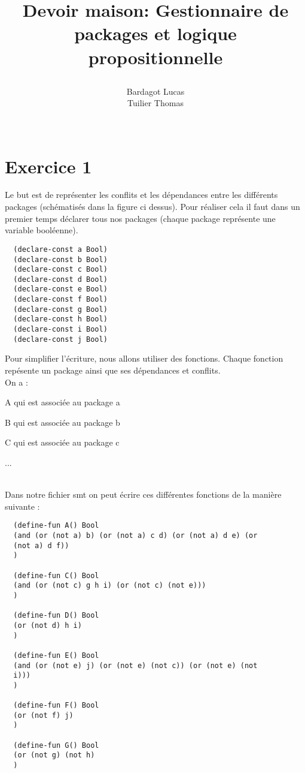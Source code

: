 \documentclass{article}
\begin{document}
\title{Devoir maison: Gestionnaire de packages et logique propositionnelle
  \author{\begin{tabular}{p{13.7cm}}
      Bardagot Lucas\\
      Tuilier Thomas
    \end{tabular}\\
    \hline}
}

\maketitle

\section*{Exercice 1}
Le but est de représenter les conflits et les dépendances entre les différents packages (schématisés dans la figure
ci dessus). Pour réaliser cela il faut dans un premier temps déclarer tous nos packages (chaque package représente
une variable booléenne).
\begin{lstlisting}
  (declare-const a Bool)
  (declare-const b Bool)
  (declare-const c Bool)
  (declare-const d Bool)
  (declare-const e Bool)
  (declare-const f Bool)
  (declare-const g Bool)
  (declare-const h Bool)
  (declare-const i Bool)
  (declare-const j Bool)
\end{lstlisting}

Pour simplifier l'écriture, nous allons utiliser des fonctions. Chaque fonction repésente un package ainsi que ses
dépendances et conflits. \\On a :\\\par A qui est associée au package a
\par B qui est associée au package b
\par C qui est associée au package c
\par ...

\\Dans notre fichier smt on peut écrire ces différentes fonctions de la manière suivante :

\begin{lstlisting}
  (define-fun A() Bool
  (and (or (not a) b) (or (not a) c d) (or (not a) d e) (or
  (not a) d f))
  )

  (define-fun C() Bool
  (and (or (not c) g h i) (or (not c) (not e)))
  )

  (define-fun D() Bool
  (or (not d) h i)
  )

  (define-fun E() Bool
  (and (or (not e) j) (or (not e) (not c)) (or (not e) (not
  i)))
  )

  (define-fun F() Bool
  (or (not f) j)
  )

  (define-fun G() Bool
  (or (not g) (not h)
  )

\end{lstlisting}
\end{document}
